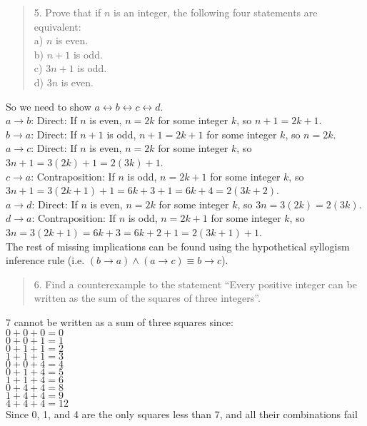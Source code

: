 \documentclass[12pt]{article}
\newenvironment{problem}[2][Problem]{\begin{trivlist}
\item[\hskip \labelsep {\bfseries #1}\hskip \labelsep {\bfseries #2.}]}{\end{trivlist}}
\begin{document}
\begin{problem}{2}
\begin{quote}
    5. Prove that if $n$ is an integer, the following four statements are equivalent:\\
a) $n$ is even.\\
b) $n + 1$ is odd.\\
c) $3n + 1$ is odd.\\
d) $3n$ is even.
\end{quote}
So we need to show $a \leftrightarrow b \leftrightarrow c \leftrightarrow d$.\\
$a \rightarrow b$: Direct: If $n$ is even, $n = 2k$ for some integer $k$, so $n+1 = 2k+1$.\\
$b \rightarrow a$: Direct: If $n+1$ is odd, $n+1 = 2k + 1$ for some integer $k$, so $n = 2k$.\\
$a \rightarrow c$: Direct: If $n$ is even, $n = 2k$ for some integer $k$, so $3n + 1 = 3(2k) + 1 = 2(3k) + 1$.\\
$c \rightarrow a$: Contraposition: If $n$ is odd, $n = 2k + 1$ for some integer $k$, so $3n+1 = 3(2k+1) + 1 = 6k+3+1 = 6k+4 = 2(3k + 2)$.\\
$a \rightarrow d$: Direct: If $n$ is even, $n = 2k$ for some integer $k$, so $3n = 3(2k) = 2(3k)$.\\
$d \rightarrow a$: Contraposition: If $n$ is odd, $n = 2k + 1$ for some integer $k$, so $3n = 3(2k+1) = 6k + 3 = 6k + 2 + 1 = 2(3k + 1) + 1$.\\
The rest of missing implications can be found using the hypothetical syllogism inference rule (i.e. $(b \rightarrow a) \land (a \rightarrow c) \equiv b \rightarrow c$).
\pagebreak
\begin{quote}
    6. Find a counterexample to the statement “Every positive integer can be written as the sum
of the squares of three integers”.
\end{quote}
7 cannot be written as a sum of three squares since:\\
$0 + 0 + 0 = 0$\\
$0 + 0 + 1 = 1$\\
$0 + 1 + 1 = 2$\\
$1 + 1 + 1 = 3$\\
$0 + 0 + 4 = 4$\\
$0 + 1 + 4 = 5$\\
$1 + 1 + 4 = 6$\\
$0 + 4 + 4 = 8$\\
$1 + 4 + 4 = 9$\\
$4 + 4 + 4 = 12$\\
Since 0, 1, and 4 are the only squares less than 7, and all their combinations fail
\end{problem}
 
\end{document}
